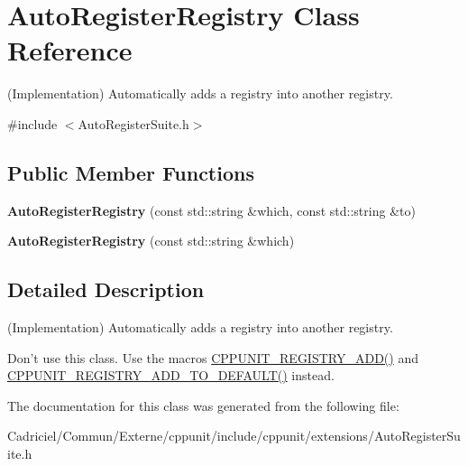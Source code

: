 \hypertarget{class_auto_register_registry}{\section{Auto\-Register\-Registry Class Reference}
\label{class_auto_register_registry}
}


(Implementation) Automatically adds a registry into another registry.  




{\ttfamily \#include $<$Auto\-Register\-Suite.\-h$>$}

\subsection*{Public Member Functions}
\begin{DoxyCompactItemize}
\item 
\hypertarget{class_auto_register_registry_aeb3c0171549420bc18714d4117d9c2b5}{{\bfseries Auto\-Register\-Registry} (const std\-::string \&which, const std\-::string \&to)}\label{class_auto_register_registry_aeb3c0171549420bc18714d4117d9c2b5}

\item 
\hypertarget{class_auto_register_registry_a3efb50c6218f5d0e5969eb6fc8bccb23}{{\bfseries Auto\-Register\-Registry} (const std\-::string \&which)}\label{class_auto_register_registry_a3efb50c6218f5d0e5969eb6fc8bccb23}

\end{DoxyCompactItemize}


\subsection{Detailed Description}
(Implementation) Automatically adds a registry into another registry. 

Don't use this class. Use the macros \hyperlink{_helper_macros_8h_a0785e2e8a821f70c69a8127c35c0a667}{C\-P\-P\-U\-N\-I\-T\-\_\-\-R\-E\-G\-I\-S\-T\-R\-Y\-\_\-\-A\-D\-D()} and \hyperlink{_helper_macros_8h_a9c3be3389213e1dc823ed580cc60878f}{C\-P\-P\-U\-N\-I\-T\-\_\-\-R\-E\-G\-I\-S\-T\-R\-Y\-\_\-\-A\-D\-D\-\_\-\-T\-O\-\_\-\-D\-E\-F\-A\-U\-L\-T()} instead. 

The documentation for this class was generated from the following file\-:\begin{DoxyCompactItemize}
\item 
Cadriciel/\-Commun/\-Externe/cppunit/include/cppunit/extensions/Auto\-Register\-Suite.\-h\end{DoxyCompactItemize}
